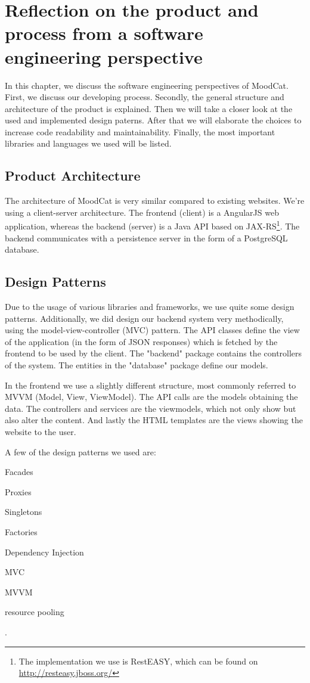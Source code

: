 \chapter{Reflection on the product and process from a software engineering perspective}
In this chapter, we discuss the software engineering perspectives of MoodCat.
First, we discuss our developing process.
Secondly, the general structure and architecture of the product is explained.
Then we will take a closer look at the used and implemented design paterns.
After that we will elaborate the choices to increase code readability and maintainability.
Finally, the most important libraries and languages we used will be listed.

\label{sec:product-achitecture}
\section{Product Architecture}
The architecture of MoodCat is very similar compared to existing websites.
We're using a client-server architecture.
The frontend (client) is a AngularJS web application, whereas the backend (server) is a Java API based on JAX-RS\footnote{The implementation we use is RestEASY, which can be found on \url{http://resteasy.jboss.org/}}. 
The backend communicates with a persistence server in the form of a PostgreSQL database.

\section{Design Patterns}
Due to the usage of various libraries and frameworks, we use quite some design patterns.
Additionally, we did design our backend system very methodically, using the model-view-controller (MVC) pattern.
The API classes define the view of the application (in the form of JSON responses) which is fetched by the frontend to be used by the client.
The "backend" package contains the controllers of the system.
The entities in the "database" package define our models.

In the frontend we use a slightly different structure, most commonly referred to MVVM (Model, View, ViewModel).
The API calls are the models obtaining the data.
The controllers and services are the viewmodels, which not only show but also alter the content.
And lastly the HTML templates are the views showing the website to the user.

A few of the design patterns we used are:
\begin{commalist}
\item Facades
\item Proxies
\item Singletons
\item Factories
\item Dependency Injection
\item MVC
\item MVVM
\item resource pooling
\end{commalist}.

